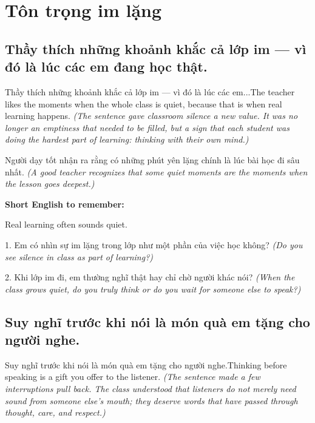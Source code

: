 \chapter{Tôn trọng im lặng}


\section{Thầy thích những khoảnh khắc cả lớp im — vì đó là lúc các em đang học thật.}
\begin{truyen}{Thầy thích những khoảnh khắc cả lớp im — vì đó là lúc các em...}{The teacher likes the moments when the whole class is quiet, because that is when real learning happens.}
\textit{(The sentence gave classroom silence a new value. It was no longer an emptiness that needed to be filled, but a sign that each student was doing the hardest part of learning: thinking with their own mind.)}
\end{truyen}

\begin{baihoc}
Người dạy tốt nhận ra rằng có những phút yên lặng chính là lúc bài học đi sâu nhất.
\textit{(A good teacher recognizes that some quiet moments are the moments when the lesson goes deepest.)}
\end{baihoc}

\begin{ghinhoanh}
\textbf{Short English to remember:}

Real learning often sounds quiet.

\end{ghinhoanh}

\begin{tuhocnhanh}
1. Em có nhìn sự im lặng trong lớp như một phần của việc học không? \textit{(Do you see silence in class as part of learning?)}

2. Khi lớp im đi, em thường nghĩ thật hay chỉ chờ người khác nói? \textit{(When the class grows quiet, do you truly think or do you wait for someone else to speak?)}
\end{tuhocnhanh}
\ngancach


\section{Suy nghĩ trước khi nói là món quà em tặng cho người nghe.}
\begin{truyen}{Suy nghĩ trước khi nói là món quà em tặng cho người nghe.}{Thinking before speaking is a gift you offer to the listener.}
\textit{(The sentence made a few interruptions pull back. The class understood that listeners do not merely need sound from someone else's mouth; they deserve words that have passed through thought, care, and respect.)}
\end{truyen}


